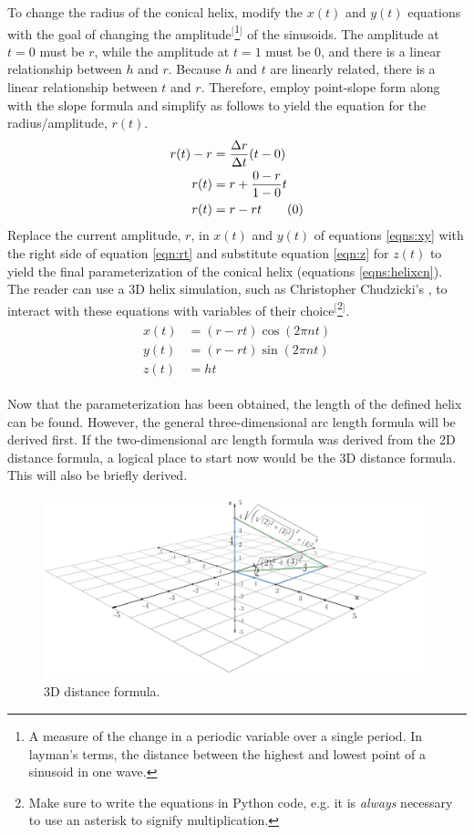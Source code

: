 \documentclass{article}
\begin{document}
To change the radius of the conical helix, modify the $x(t)$ and $y(t)$ equations with the goal of changing the amplitude$^[$\footnote{A measure of the change in a periodic variable over a single period. In layman's terms, the distance between the highest and lowest point of a sinusoid in one wave.}$^]$ of the sinusoids. The amplitude at $t=0$ must be $r$, while the amplitude at $t=1$ must be $0$, and there is a linear relationship between $h$ and $r$. Because $h$ and $t$ are linearly related, there is a linear relationship between $t$ and $r$. Therefore, employ point-slope form along with the slope formula and simplify as follows to yield the equation for the radius/amplitude, $r(t)$.
\begin{align*}
    r(t)-r &= \frac{\Delta r}{\Delta t}(t-0)\\
    r(t) &= r+\frac{0-r}{1-0}t\\
    r(t) &= r-rt\tag{\theequation}\label{eqn:rt}
    \stepcounter{equation}
\end{align*}
Replace the current amplitude, $r$, in $x(t)$ and $y(t)$ of equations \ref{eqns:xy} with the right side of equation \ref{eqn:rt} and substitute equation \ref{eqn:z} for $z(t)$ to yield the final parameterization of the conical helix (equations \ref{eqns:helixcn}). The reader can use a 3D helix simulation, such as Christopher Chudzicki's \cite{Bib:sim}, to interact with these equations with variables of their choice$^[$\footnote{Make sure to write the equations in Python code, e.g. it is \textit{always} necessary to use an asterisk to signify multiplication.}$^]$.
\begin{align}\label{eqns:helixcn}
    \begin{split}
        x(t) &= (r-rt)\cos(2\pi nt)\\
        y(t) &= (r-rt)\sin(2\pi nt)\\
        z(t) &= ht
    \end{split}
\end{align}

\bigskip
Now that the parameterization has been obtained, the length of the defined helix can be found. However, the general three-dimensional arc length formula will be derived first. If the two-dimensional arc length formula was derived from the 2D distance formula, a logical place to start now would be the 3D distance formula. This will also be briefly derived.

\begin{figure}[h!]
    \centering
    \includegraphics[width=0.711\linewidth]{Blender/3Ddist.png}
    \caption{3D distance formula.}
    \label{fig:3Ddist}
\end{figure}
\end{document}
